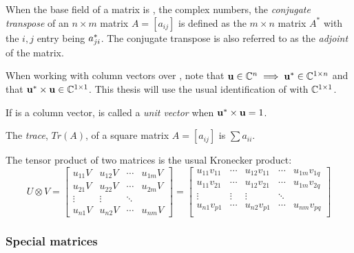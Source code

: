 \begin{definition}\label{def:conjugate_transpose}
  When the base field of a matrix is \complex, the complex numbers, the \emph{conjugate transpose}
  of an $n\times m$ matrix $A=[a_{i j}]$ is defined as the $m\times
  n$ matrix $A^{*}$ with the $i,j$ entry being ${a}^{*}_{j i}$. The conjugate transpose is
  also referred to as the \emph{adjoint} of the matrix.
\end{definition}

When working with column vectors over \complex, note that $\mathbf{u} \in \mathbb{C}^n \implies
\mathbf{u}^{*} \in \mathbb{C}^{1\times n}$ and that $\mathbf{u}^{*}\times \mathbf{u} \in \mathbb{C}^{1\times 1}$.
This thesis will use the usual identification of \complex{} with $\mathbb{C}^{1\times1}$.

\begin{definition}\label{def:unit_vector}
  If  is a \complex column vector,  is called a \emph{unit vector} when
  $\mathbf{u}^{*}\times \mathbf{u} = 1$.
\end{definition}

\begin{definition}\label{def:trace}
  The \emph{trace}, $Tr(A)$, of a square matrix $A=[a_{i j}]$ is $\sum a_{ii}$.
\end{definition}

The tensor product of two matrices is the usual Kronecker product:
  \[
    U\otimes V =
    \begin{bmatrix}
      u_{11}V&u_{12}V & \cdots &u_{1m}V\\
      u_{21}V&u_{22}V & \cdots &u_{2m}V \\
      \vdots&\vdots&\ddots\\
      u_{n1}V&u_{n2}V & \cdots &u_{n m}V
    \end{bmatrix}
    =
    \begin{bmatrix}
      u_{11}v_{11}&\cdots&u_{12}v_{11} & \cdots& u_{1m}v_{1q} \\
      u_{11}v_{21}&\cdots&u_{12}v_{21} & \cdots& u_{1m}v_{2q} \\
      \vdots&\vdots&\vdots&\ddots \\
      u_{n1}v_{p1}&\cdots&u_{n2}v_{p1} & \cdots& u_{n m}v_{p q} \\
    \end{bmatrix}
  \]

\subsubsection{Special matrices} %
\label{ssub:special_matrices}

